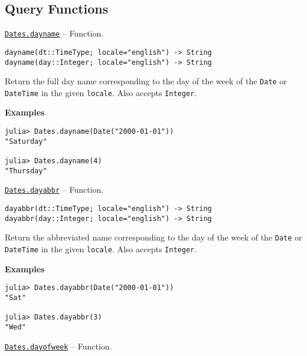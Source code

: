 \hypertarget{16158364891045757229}{}


\subsection{Query Functions}


\hypertarget{2440842966718954493}{} 
\hyperlink{2440842966718954493}{\texttt{Dates.dayname}}  -- {Function.}

\begin{adjustwidth}{2em}{0pt}


\begin{verbatim}
dayname(dt::TimeType; locale="english") -> String
dayname(day::Integer; locale="english") -> String
\end{verbatim}

Return the full day name corresponding to the day of the week of the \texttt{Date} or \texttt{DateTime} in the given \texttt{locale}. Also accepts \texttt{Integer}.

\textbf{Examples}


\begin{verbatim}
julia> Dates.dayname(Date("2000-01-01"))
"Saturday"

julia> Dates.dayname(4)
"Thursday"
\end{verbatim}



\end{adjustwidth}
\hypertarget{18198970391837299875}{} 
\hyperlink{18198970391837299875}{\texttt{Dates.dayabbr}}  -- {Function.}

\begin{adjustwidth}{2em}{0pt}


\begin{verbatim}
dayabbr(dt::TimeType; locale="english") -> String
dayabbr(day::Integer; locale="english") -> String
\end{verbatim}

Return the abbreviated name corresponding to the day of the week of the \texttt{Date} or \texttt{DateTime} in the given \texttt{locale}. Also accepts \texttt{Integer}.

\textbf{Examples}


\begin{verbatim}
julia> Dates.dayabbr(Date("2000-01-01"))
"Sat"

julia> Dates.dayabbr(3)
"Wed"
\end{verbatim}



\end{adjustwidth}
\hypertarget{12798531608759474645}{} 
\hyperlink{12798531608759474645}{\texttt{Dates.dayofweek}}  -- {Function.}


